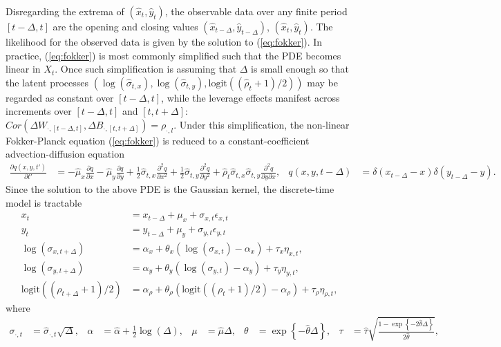 \documentclass[10pt]{article}
\newcommand{\halpha}{\hat{\alpha}}
\begin{document}
Disregarding the extrema of $(\hat{x}_t, \hat{y}_t)$, the observable
data over any finite period $[t-\Delta, t]$ are the opening and
closing values $(\hat{x}_{t-\Delta}, \hat{y}_{t-\Delta})$,
$(\hat{x}_{t}, \hat{y}_{t})$. The likelihood for the observed data is
given by the solution to (\ref{eq:fokker}). In practice,
(\ref{eq:fokker}) is most commonly simplified such that the PDE
becomes linear in $X_t$. Once such simplification is assuming that
$\Delta$ is small enough so that the latent processes
$(\log(\hat{\sigma}_{t,x}), \log(\hat{\sigma}_{t,y}),
\mbox{logit}((\hat{\rho}_t+1)/2))$ may be regarded as constant over
$[t-\Delta,t]$, while the leverage effects manifest across increments
over $[t-\Delta,t]$ and $[t, t+\Delta]$:
$Cor(\Delta W_{\cdot, [t-\Delta,t]}, \Delta B_{\cdot, [t, t+\Delta]})
= \rho_{\cdot, l}$. Under this simplification, the non-linear
Fokker-Planck equation (\ref{eq:fokker}) is reduced to a
constant-coefficient advection-diffusion equation
\begin{align*}
  \frac{\partial q(x,y,t')}{\partial t'} &= -\hat{\mu}_x
  \frac{\partial q}{\partial x} -\hat{\mu}_y
  \frac{\partial q}{\partial y}  + \frac{1}{2} \hat{\sigma}_{t,x}
  \frac{\partial^2 q}{\partial x^2} + \frac{1}{2} \hat{\sigma}_{t,y}
  \frac{\partial^2 q}{\partial y^2} + \hat{\rho}_t\hat{\sigma}_{t,x}\hat{\sigma}_{t,y}\frac{\partial^2 q}{\partial y \partial x}, & q(x,y,t-\Delta) &= \delta(x_{t-\Delta}-x)\delta(y_{t-\Delta} - y).
\end{align*}
Since the solution to the above PDE is the Gaussian kernel, the
discrete-time model is tractable
\begin{align}
  x_t &= x_{t-\Delta} + \mu_x + \sigma_{x,t} \epsilon_{x,t} \nonumber \\
  y_t &= y_{t-\Delta} + \mu_y + \sigma_{y,t} \epsilon_{y,t} \nonumber \\
   \log(\sigma_{x,t+\Delta}) &= \alpha_x + \theta_x(\log(\sigma_{x,t}) - \alpha_x) + \tau_x \eta_{x,t}, \label{eq:discrete-model} \\
  \log(\sigma_{y,t+\Delta}) &= \alpha_y + \theta_y(\log(\sigma_{y,t}) - \alpha_y) + \tau_y \eta_{y,t}, \nonumber \\
  \mbox{logit}((\rho_{t+\Delta} + 1)/2) &= \alpha_\rho + \theta_\rho\left(\mbox{logit}((\rho_{t}+1)/2) - \alpha_\rho\right) + \tau_{\rho} \eta_{\rho,t}, \nonumber
\end{align}
where
\begin{align}
  \sigma_{\cdot,t} &= \hat{\sigma}_{\cdot,t}\sqrt{\Delta}, &\alpha &= \halpha + \frac{1}{2}\log(\Delta) , &
  \mu &= \hat{\mu} \Delta , & \theta &= \exp\left\{
    -\hat{\theta} \Delta \right\} , & \tau &= \hat{\tau}
  \sqrt{ \frac{1 - \exp \left\{ -2\hat{\theta} \Delta
      \right\}}{2\hat{\theta} } }, \label{eq:mu_sigma_tau}
\end{align}
\end{document}
